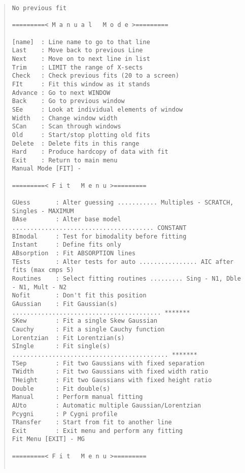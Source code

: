 \begin{quote}\begin{verbatim}
No previous fit
 
=========< M a n u a l   M o d e >=========
 
[name]  : Line name to go to that line
Last    : Move back to previous Line
Next    : Move on to next line in list
Trim    : LIMIT the range of X-sects
Check   : Check previous fits (20 to a screen)
FIt     : Fit this window as it stands
Advance : Go to next WINDOW
Back    : Go to previous window
SEe     : Look at individual elements of window
Width   : Change window width
SCan    : Scan through windows
Old     : Start/stop plotting old fits
Delete  : Delete fits in this range
Hard    : Produce hardcopy of data with fit
Exit    : Return to main menu
Manual Mode [FIT] -
 
=========< F i t   M e n u >=========
 
GUess       : Alter guessing ........... Multiples - SCRATCH, Singles - MAXIMUM
BAse        : Alter base model ....................................... CONSTANT
BImodal     : Test for bimodality before fitting
Instant     : Define fits only
ABsorption  : Fit ABSORPTION lines
TEsts       : Alter tests for auto ................ AIC after fits (max cmps 5)
Routines    : Select fitting routines ......... Sing - N1, Dble - N1, Mult - N2
Nofit       : Don't fit this position
GAussian    : Fit Gaussian(s) ......................................... *******
SKew        : Fit a single Skew Gaussian
Cauchy      : Fit a single Cauchy function
Lorentzian  : Fit Lorentzian(s)
SIngle      : Fit single(s) ........................................... *******
TSep        : Fit two Gaussians with fixed separation
TWidth      : Fit two Gaussians with fixed width ratio
THeight     : Fit two Gaussians with fixed height ratio
Double      : Fit double(s)
Manual      : Perform manual fitting
AUto        : Automatic multiple Gaussian/Lorentzian
Pcygni      : P Cygni profile
TRansfer    : Start from fit to another line
Exit        : Exit menu and perform any fitting
Fit Menu [EXIT] - MG
 
=========< F i t   M e n u >=========
 

\end{verbatim}
\end{quote}
